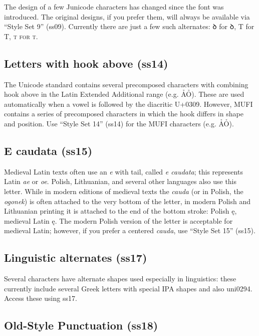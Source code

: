 \documentclass[12pt,a4paper,openany]{book}
\begin{document}
The design of a few Junicode characters has changed since the font was
introduced. The original designs, if you prefer them, will always be
available via “Style Set 9” (ss09). Currently there are just a few
such alternates: { ꝺ} for ꝺ,
{ T} for T,
{\scshape{ t} for t}.

\subsection*{Letters with hook above (ss14)}

The Unicode standard contains several precomposed characters with
combining hook above in the Latin Extended Additional range
(e.g. ẢỎ). These are used automatically when a vowel is followed by
the diacritic U+0309. However, MUFI contains a series of precomposed
characters in which the hook differs in shape and position. Use “Style
Set 14” (ss14) for the MUFI characters (e.g.
ẢỎ).

\subsection*{E caudata (ss15)}

Medieval Latin texts often use an {\itshape e} with tail, called
{\itshape e caudata}; this represents Latin {\itshape ae} or {\itshape
  oe}. Polish, Lithuanian, and several other languages also use this
letter. While in modern editions of medieval texts the {\itshape
  cauda} (or in Polish, the {\itshape ogonek}) is often attached to
the very bottom of the letter, in modern Polish and Lithuanian
printing it is attached to the end of the bottom stroke: Polish ę,
medieval Latin {ę}. The modern
Polish version of the letter is acceptable for medieval Latin;
however, if you prefer a centered {\itshape cauda}, use
“Style Set 15” (ss15).

\subsection*{Linguistic alternates (ss17)}

Several characters have alternate shapes used especially in
linguistics: these currently include several Greek letters with
special IPA shapes and also uni0294. Access these using ss17.

\subsection*{Old-Style Punctuation (ss18)}
\end{document}
